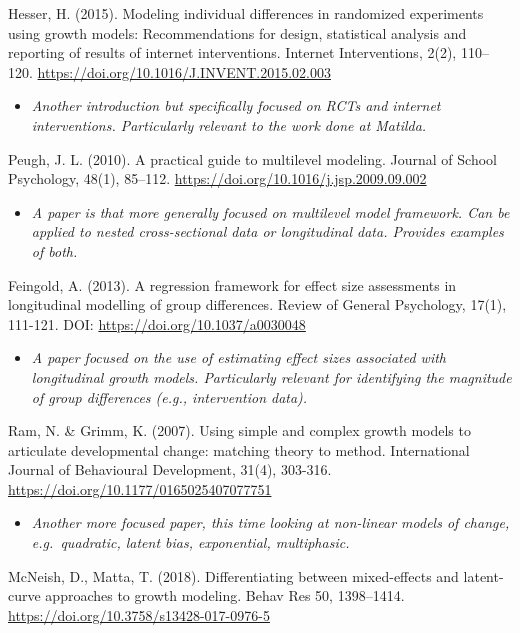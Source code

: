\documentclass[
]{book}
\providecommand{\tightlist}{%
  \setlength{\itemsep}{0pt}\setlength{\parskip}{0pt}}
\begin{document}
Hesser, H. (2015). Modeling individual differences in randomized experiments using growth models: Recommendations for design, statistical analysis and reporting of results of internet interventions. Internet Interventions, 2(2), 110--120. \url{https://doi.org/10.1016/J.INVENT.2015.02.003}

\begin{itemize}
\tightlist
\item
  \emph{Another introduction but specifically focused on RCTs and internet interventions. Particularly relevant to the work done at Matilda.}
\end{itemize}

Peugh, J. L. (2010). A practical guide to multilevel modeling. Journal of School Psychology, 48(1), 85--112. \url{https://doi.org/10.1016/j.jsp.2009.09.002}

\begin{itemize}
\tightlist
\item
  \emph{A paper is that more generally focused on multilevel model framework. Can be applied to nested cross-sectional data or longitudinal data. Provides examples of both. }
\end{itemize}

Feingold, A. (2013). A regression framework for effect size assessments in longitudinal modelling of group differences. Review of General Psychology, 17(1), 111-121. DOI: \url{https://doi.org/10.1037/a0030048}

\begin{itemize}
\tightlist
\item
  \emph{A paper focused on the use of estimating effect sizes associated with longitudinal growth models. Particularly relevant for identifying the magnitude of group differences (e.g., intervention data).}
\end{itemize}

Ram, N. \& Grimm, K. (2007). Using simple and complex growth models to articulate developmental change: matching theory to method. International Journal of Behavioural Development, 31(4), 303-316. \url{https://doi.org/10.1177/0165025407077751}

\begin{itemize}
\tightlist
\item
  \emph{Another more focused paper, this time looking at non-linear models of change, e.g.~quadratic, latent bias, exponential, multiphasic. }
\end{itemize}

McNeish, D., Matta, T. (2018). Differentiating between mixed-effects and latent-curve approaches to growth modeling. Behav Res 50, 1398--1414. \url{https://doi.org/10.3758/s13428-017-0976-5}
\end{document}
